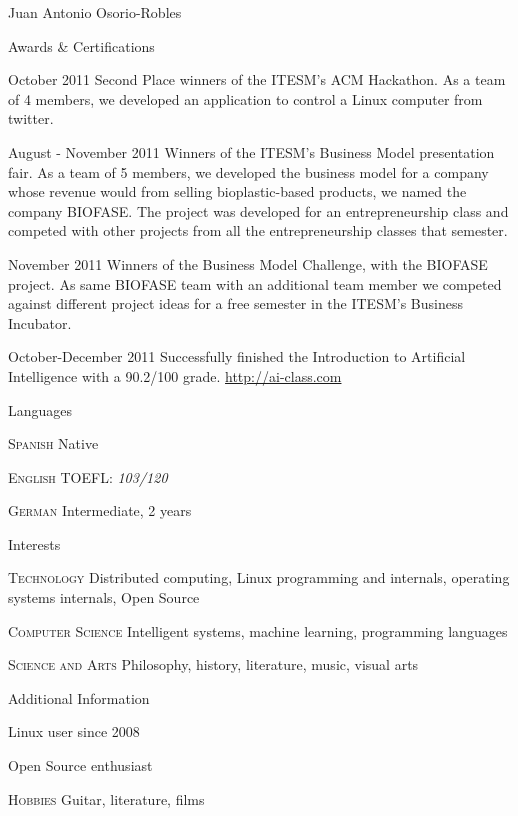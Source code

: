 \documentclass[spanish,10pt,letterpaper]{article}
\begin{document}
\begin{cv}{Juan Antonio Osorio-Robles}
	\begin{cvlist}{Awards \& Certifications}
		\item [October 2011] Second Place winners of the ITESM's ACM Hackathon. As a team of 4 members, we developed an application to control a Linux computer from twitter.
		\item [August - November 2011] Winners of the ITESM's Business Model presentation fair. As a team of 5 members, we developed the business model for a company whose revenue would from selling bioplastic-based products, we named the company BIOFASE. The project was developed for an entrepreneurship class and competed with other projects from all the entrepreneurship classes that semester.
		\item [November 2011] Winners of the Business Model Challenge, with the BIOFASE project. As same BIOFASE team with an additional team member we competed against different project ideas for a free semester in the ITESM's Business Incubator.
		\item [October-December 2011] Successfully finished the Introduction to Artificial Intelligence with a 90.2/100 grade. \href{http://ai-class.com}{http://ai-class.com}
	\end{cvlist}


	\begin{cvlist}{Languages}
		\item [\textsc {Spanish}]
				Native
		\item [\textsc {English}]
				TOEFL: \emph{103/120}
		\item [\textsc {German}]
				Intermediate, 2 years
		\end{cvlist}

	\begin{cvlist}{Interests}
		\item [\textsc {Technology}]
				Distributed computing, Linux programming and internals, operating systems internals, Open Source
		\item [\textsc {Computer Science}]
				Intelligent systems, machine learning, programming languages
		\item [\textsc {Science and Arts}]
				Philosophy, history, literature, music, visual arts 
	\end{cvlist}

	\begin{cvlist}{Additional Information}
		\item [  ] Linux user since 2008
		\item [  ] Open Source enthusiast
		\item [\textsc {Hobbies}]
				Guitar, literature, films
	\end{cvlist}


\end{cv}
\end{document}
